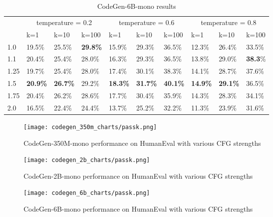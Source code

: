 \documentclass{article}
\begin{document}
\begin{table}[t]
    \centering
    \begin{tabular}{llllllllll}
        \toprule
        & \multicolumn{3}{c}{temperature = 0.2} & \multicolumn{3}{c}{temperature = 0.6} & \multicolumn{3}{c}{temperature = 0.8} \\
         \cmidrule(r){2-4} \cmidrule(r){5-7} \cmidrule(r){8-10}
         & k=1 & k=10 & k=100 & k=1 & k=10 & k=100 & k=1 & k=10 & k=100 \\
        \midrule
        1.0 & 19.5\% & 25.5\% & \textbf{29.8\%} & 15.9\% & 29.3\% & 36.5\% & 12.3\% & 26.4\% & 33.5\% \\
        1.1 & 20.4\% & 25.4\% & 28.0\% & 16.3\% & 29.3\% & 36.5\% & 13.8\% & 29.0\% & \textbf{38.3}\% \\
        1.25 & 19.7\% & 25.4\% & 28.0\% & 17.4\% & 30.1\% & 38.3\% & 14.1\% & 28.7\% & 37.6\% \\
        1.5 & \textbf{20.9\%} & \textbf{26.7\%} & 29.2\% & \textbf{18.3\%} & \textbf{31.7\%} & \textbf{40.1\%} & \textbf{14.9\%} & \textbf{29.1\%} & 36.5\% \\
        1.75 & 20.4\% & 26.2\% & 28.6\% & 17.7\% & 30.4\% & 35.9\% & 14.3\% & 28.3\% & 34.1\% \\
        2.0 & 16.5\% & 22.4\% & 24.4\% & 13.7\% & 25.2\% & 32.2\% & 11.3\% & 23.9\% & 31.6\% \\
        \bottomrule
    \end{tabular}
    \caption{CodeGen-6B-mono results}
    \label{tab:codegen-6b}
\end{table}
\begin{figure}[!ht]
    \texttt{[image: codegen\_350m\_charts/passk.png]}
    \caption{CodeGen-350M-mono performance on HumanEval with various CFG strengths}\label{fig:codegen350}
\end{figure}

\begin{figure}[!ht]
    \texttt{[image: codegen\_2b\_charts/passk.png]}
    \caption{CodeGen-2B-mono performance on HumanEval with various CFG strengths}\label{fig:codegen2b}
\end{figure}

\begin{figure}[!ht]
    \texttt{[image: codegen\_6b\_charts/passk.png]}
    \caption{CodeGen-6B-mono performance on HumanEval with various CFG strengths}\label{fig:codegen6b}
\end{figure}
\end{document}
